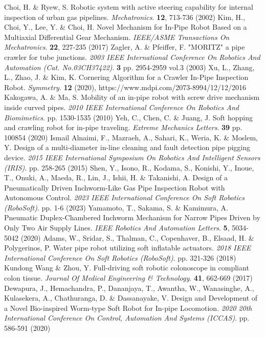 \documentclass[letterpaper, 10 pt, conference]{ieeeconf}  %
\begin{document}
\begin{thebibliography}{99}
Choi, H. \& Ryew, S. Robotic system with active steering capability for internal inspection of urban gas pipelines. {\em Mechatronics}. \textbf{12}, 713-736 (2002)
Kim, H., Choi, Y., Lee, Y. \& Choi, H. Novel Mechanism for In-Pipe Robot Based on a Multiaxial Differential Gear Mechanism. {\em IEEE/ASME Transactions On Mechatronics}. \textbf{22}, 227-235 (2017)
Zagler, A. \& Pfeiffer, F. "MORITZ" a pipe crawler for tube junctions. {\em 2003 IEEE International Conference On Robotics And Automation (Cat. No.03CH37422)}. \textbf{3} pp. 2954-2959 vol.3 (2003)
Xu, L., Zhang, L., Zhao, J. \& Kim, K. Cornering Algorithm for a Crawler In-Pipe Inspection Robot. {\em Symmetry}. \textbf{12} (2020), https://www.mdpi.com/2073-8994/12/12/2016
Kakogawa, A. \& Ma, S. Mobility of an in-pipe robot with screw drive mechanism inside curved pipes. {\em 2010 IEEE International Conference On Robotics And Biomimetics}. pp. 1530-1535 (2010)
Yeh, C., Chen, C. \& Juang, J. Soft hopping and crawling robot for in-pipe traveling. {\em Extreme Mechanics Letters}. \textbf{39} pp. 100854 (2020)
Ismail Alnaimi, F., Mazraeh, A., Sahari, K., Weria, K. \& Moslem, Y. Design of a multi-diameter in-line cleaning and fault detection pipe pigging device. {\em 2015 IEEE International Symposium On Robotics And Intelligent Sensors (IRIS)}. pp. 258-265 (2015)
Shen, Y., Isono, R., Kodama, S., Konishi, Y., Inoue, T., Onuki, A., Maeda, R., Lin, J., Ishii, H. \& Takanishi, A. Design of a Pneumatically Driven Inchworm-Like Gas Pipe Inspection Robot with Autonomous Control. {\em 2023 IEEE International Conference On Soft Robotics (RoboSoft)}. pp. 1-6 (2023)
Yamamoto, T., Sakama, S. \& Kamimura, A. Pneumatic Duplex-Chambered Inchworm Mechanism for Narrow Pipes Driven by Only Two Air Supply Lines. {\em IEEE Robotics And Automation Letters}. \textbf{5}, 5034-5042 (2020)
Adams, W., Sridar, S., Thalman, C., Copenhaver, B., Elsaad, H. \& Polygerinos, P. Water pipe robot utilizing soft inflatable actuators. {\em 2018 IEEE International Conference On Soft Robotics (RoboSoft)}. pp. 321-326 (2018)
Kundong Wang \& Zhou, Y. Full-driving soft robotic colonoscope in compliant colon tissue. {\em Journal Of Medical Engineering \& Technology}. \textbf{41}, 662-669 (2017)
Dewapura, J., Hemachandra, P., Dananjaya, T., Awantha, W., Wanasinghe, A., Kulasekera, A., Chathuranga, D. \& Dassanayake, V. Design and Development of a Novel Bio-inspired Worm-type Soft Robot for In-pipe Locomotion. {\em 2020 20th International Conference On Control, Automation And Systems (ICCAS)}. pp. 586-591 (2020)

\end{thebibliography}
\end{document}
